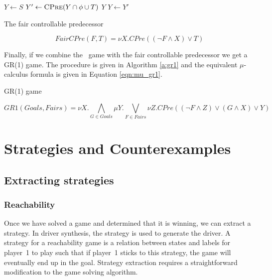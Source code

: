 \begin{algorithm}[t]
\begin{algorithmic}
\State $Y \gets S$
\Loop
\State $Y' \gets \Call{CPre}{Y \cap \phi \cup T}$
\State\Return $Y$\EndIf
\State $Y \gets Y'$
\EndLoop
\EndFunction
\end{algorithmic}
\caption{The fair controllable predecessor}
\label{a:fair_cpre}
\end{algorithm}

\begin{equation}
FairCPre(F, T) = \nu X. CPre((\neg F \wedge X) \vee T)
\label{eqn:mu_fair}
\end{equation}

Finally, if we combine the \buchi\ game with the fair controllable predecessor we get a GR(1) game. The procedure is given in Algorithm \ref{a:gr1} and the equivalent $\mu$-calculus formula is given in Equation \ref{eqn:mu_gr1}.

\begin{algorithm}[t]
\begin{algorithmic}
\State\Return {}
\EndFunction
\end{algorithmic}
\caption{GR(1) game}
\label{a:gr1}
\end{algorithm}

\begin{equation}
    GR1(Goals, Fairs) = \nu X. \bigwedge_{G \in Goals} \mu Y. \bigvee_{F \in Fairs} \nu Z. CPre((\neg F \wedge Z) \vee (G \wedge X) \vee Y)
\label{eqn:mu_gr1}
\end{equation}

\section{Strategies and Counterexamples}

\subsection{Extracting strategies}

\subsubsection{Reachability}

Once we have solved a game and determined that it is winning, we can extract a strategy. In driver synthesis, the strategy is used to generate the driver. A strategy for a reachability game is a relation between states and labels for player~1 to play such that if player~1 sticks to this strategy, the game will eventually end up in the goal. Strategy extraction requires a straightforward modification to the game solving algorithm.

